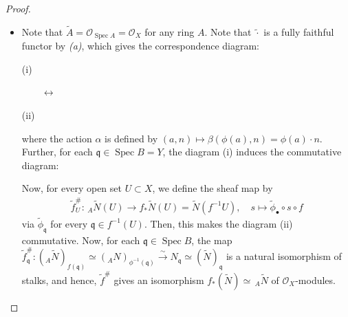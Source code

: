 \documentclass[11pt,a4paper,footinclude=true,headinclude=true]{scrbook} %
\DeclareMathOperator{\Spec}{Spec}
\newcommand{\OO}{\mathcal{O}}
\newcommand{\qq}{\mathfrak{q}}
\newcommand{\<}{\langle}
\newcommand{\>}{\rangle}
\begin{document}
\begin{proof}
\begin{itemize}
\begin{align*}
        \end{align*}
        as stalks. Thus, $(\bigoplus_{i\in I}M_i)\widetilde{}\simeq\bigoplus_{i\in I}\widetilde{M}_i$ as sheaves.
        \item[(d)] Note that $\widetilde{A}=\OO_{\Spec A}=\OO_X$ for any ring $A$. Note that $\widetilde{\cdot}$ is a fully faithful functor by \textit{(a)}, which gives the correspondence diagram:
        \begin{center}
            (i)\qquad
            $\qquad\longleftrightarrow\qquad$
            \qquad(ii)
        \end{center}
        where the action $\alpha$ is defined by $(a,n)\mapsto\beta(\phi(a),n)=\phi(a)\cdot n$. Further, for each $\qq\in\Spec B=Y$, the diagram (i) induces the commutative diagram:
        \begin{center}
        \end{center}
        Now, for every open set $U\subset X$, we define the sheaf map by
        \begin{align*}
            \tilde{f}^{\#}_U:\,_A\widetilde{N}(U)\longrightarrow f_\ast\widetilde{N}(U)=\widetilde{N}(f^{-1}U),\quad s\longmapsto\tilde{\phi}_\bullet\circ s\circ f
        \end{align*}
        via $\tilde{\phi}_\qq$ for every $\qq\in f^{-1}(U)$. Then, this makes the diagram (ii) commutative. Now, for each $\qq\in\Spec B$, the map $\tilde{f}^{\#}_\qq:(_A\widetilde{N})_{f(\qq)}\simeq(_AN)_{\phi^{-1}(\qq)}\xrightarrow{\sim}N_\qq\simeq(\widetilde{N})_\qq$ is a natural isomorphism of stalks, and hence, $\tilde{f}^{\#}$ gives an isomorphism $f_\ast(\widetilde{N})\simeq\,_A\widetilde{N}$ of $\OO_X$-modules.

\end{itemize}
\end{proof}
\end{document}
